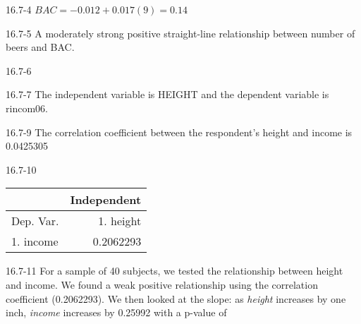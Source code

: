 \begin{exsol@solution}{16.7-4}
     $ BAC = -0.012 + 0.017 (9) = 0.14 $

\end{exsol@solution}
\begin{exsol@solution}{16.7-5}
    A moderately strong positive straight-line relationship between number of beers and BAC.

\end{exsol@solution}
\begin{exsol@solution}{16.7-6}

\end{exsol@solution}
\begin{exsol@solution}{16.7-7}
       The independent variable is HEIGHT and the dependent variable is rincom06.

\end{exsol@solution}
\begin{exsol@solution}{16.7-9}
       The correlation coefficient between the respondent's height and income is 0.0425305

\end{exsol@solution}
\begin{exsol@solution}{16.7-10}
       \begin{table}[ht]
    \centering
    \begin{tabular}{lr} \hline
        &  \multicolumn{1}{c}{Independent} \\ \hline

    Dep. Var. & 1. height      \\ \hline
    1. income  &   0.2062293      \\ \hline

    \end{tabular}
    \end{table}

\end{exsol@solution}
\begin{exsol@solution}{16.7-11}
    For a sample of 40 subjects, we tested the relationship between height and income.  We found a weak positive relationship using the correlation coefficient (0.2062293).  We then looked at the slope:  as {\textit{height}} increases by one inch, {\textit{income}} increases by 0.25992 with a p-value of

\end{exsol@solution}

